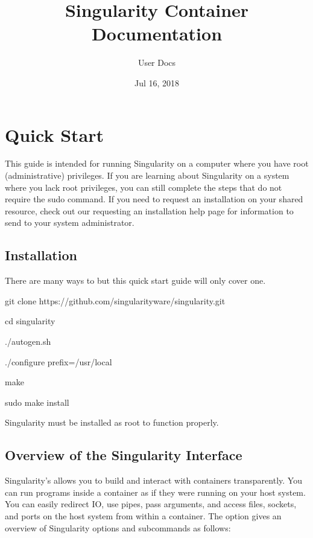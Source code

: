 \documentclass[letterpaper,10pt,english]{sphinxmanual}
\title{Singularity Container Documentation}
\date{Jul 16, 2018}
\author{User Docs}
\begin{document}
\maketitle
\sphinxtableofcontents
{}\label{\detokenize{index::doc}}



\chapter{Quick Start}
\label{\detokenize{quick_start:quick-start}}\label{\detokenize{quick_start:id1}}\label{\detokenize{quick_start::doc}}\label{\detokenize{quick_start:sec-quickstart}}
This guide is intended for running Singularity on a computer where you
have root (administrative) privileges. If you are learning about
Singularity on a system where you lack root privileges, you can still
complete the steps that do not require the sudo command. If you need to
request an installation on your shared resource, check out our
requesting an installation help page for information to send to your
system administrator.


\section{Installation}
\label{\detokenize{quick_start:installation}}\label{\detokenize{quick_start:id2}}
There are many ways to {\hyperref[\detokenize{quick_start:installation}]{}} but this quick start guide will only cover one.

%
\begin{sphinxVerbatim}[commandchars=\\\{\}]
git clone https://github.com/singularityware/singularity.git

cd singularity

./autogen.sh

./configure \PYGZhy{}\PYGZhy{}prefix=/usr/local

make

sudo make install
\end{sphinxVerbatim}

Singularity must be installed as root to function properly.


\section{Overview of the Singularity Interface}
\label{\detokenize{quick_start:overview-of-the-singularity-interface}}
Singularity’s {\hyperref[\detokenize{appendix:command-usage}]{}} allows you to build and interact with containers
transparently. You can run programs inside a container as if they were
running on your host system. You can easily redirect IO, use pipes,
pass arguments, and access files, sockets, and ports on the host
system from within a container.
The  option gives an overview of Singularity options and subcommands as
follows:
\end{document}
